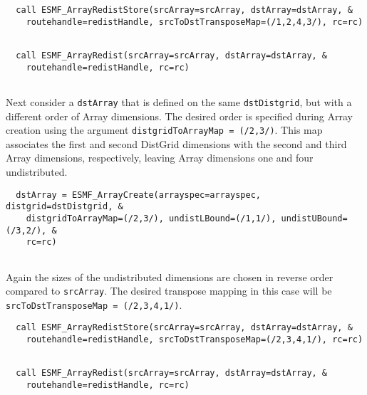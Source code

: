  \begin{verbatim}
  call ESMF_ArrayRedistStore(srcArray=srcArray, dstArray=dstArray, &
    routehandle=redistHandle, srcToDstTransposeMap=(/1,2,4,3/), rc=rc)
 
\end{verbatim}
 

 \begin{verbatim}
  call ESMF_ArrayRedist(srcArray=srcArray, dstArray=dstArray, &
    routehandle=redistHandle, rc=rc)
 
\end{verbatim}
 

   Next consider a {\tt dstArray} that is defined on the same {\tt dstDistgrid},
   but with a different order of Array dimensions. The desired order is
   specified during Array creation using the argument 
   {\tt distgridToArrayMap = (/2,3/)}. This map associates the first and second
   DistGrid dimensions with the second and third Array dimensions, respectively,
   leaving Array dimensions one and four undistributed. 

 \begin{verbatim}
  dstArray = ESMF_ArrayCreate(arrayspec=arrayspec, distgrid=dstDistgrid, &
    distgridToArrayMap=(/2,3/), undistLBound=(/1,1/), undistUBound=(/3,2/), &
    rc=rc)
 
\end{verbatim}
 

   Again the sizes of the undistributed dimensions are chosen in reverse order
   compared to {\tt srcArray}. The desired transpose mapping in this case will
   be {\tt srcToDstTransposeMap = (/2,3,4,1/)}. 

 \begin{verbatim}
  call ESMF_ArrayRedistStore(srcArray=srcArray, dstArray=dstArray, &
    routehandle=redistHandle, srcToDstTransposeMap=(/2,3,4,1/), rc=rc)
 
\end{verbatim}
 

 \begin{verbatim}
  call ESMF_ArrayRedist(srcArray=srcArray, dstArray=dstArray, &
    routehandle=redistHandle, rc=rc)
 
\end{verbatim}
 
